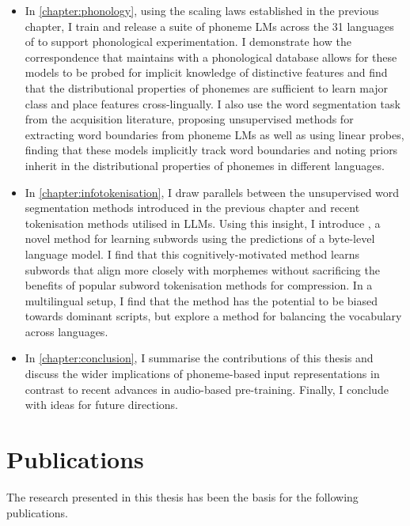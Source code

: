 \begin{itemize}
    \item In \cref{chapter:phonology}, using the scaling laws established in the previous chapter, I train and release a suite of phoneme LMs across the 31 languages of \ipachildes to support phonological experimentation. I demonstrate how the correspondence that \gpp maintains with a phonological database allows for these models to be probed for implicit knowledge of distinctive features and find that the distributional properties of phonemes are sufficient to learn major class and place features cross-lingually. I also use the word segmentation task from the acquisition literature, proposing unsupervised methods for extracting word boundaries from phoneme LMs as well as using linear probes, finding that these models implicitly track word boundaries and noting priors inherit in the distributional properties of phonemes in different languages.
    \item In \cref{chapter:infotokenisation}, I draw parallels between the unsupervised word segmentation methods introduced in the previous chapter and recent tokenisation methods utilised in LLMs. Using this insight, I introduce \bytespan, a novel method for learning subwords using the predictions of a byte-level language model. I find that this cognitively-motivated method learns subwords that align more closely with morphemes without sacrificing the benefits of popular subword tokenisation methods for compression. In a multilingual setup, I find that the method has the potential to be biased towards dominant scripts, but explore a method for balancing the vocabulary across languages. 
    \item In \cref{chapter:conclusion}, I summarise the contributions of this thesis and discuss the wider implications of phoneme-based input representations in contrast to recent advances in audio-based pre-training. Finally, I conclude with ideas for future directions.
\end{itemize}

\section{Publications}

The research presented in this thesis has been the basis for the following publications.

